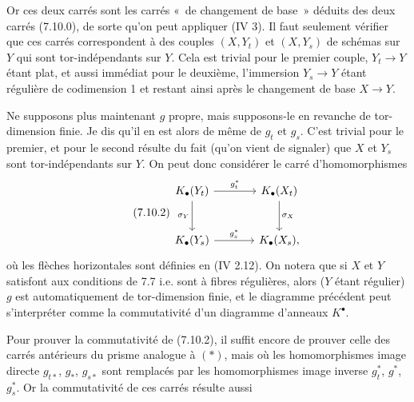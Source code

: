 

Or ces
deux carrés sont les carrés «~de changement de base~» déduits des deux carrés (7.10.0), de sorte qu'on peut appliquer (IV 3). Il faut seulement vérifier que ces carrés correspondent à des couples \((X,Y_t)\) et \((X,Y_s)\) de schémas sur \(Y\) qui sont tor-indépendants sur \(Y\). Cela est trivial pour le premier couple, \(Y_t\to Y\) étant plat, et aussi immédiat pour le deuxième, l'immersion \(Y_s\to Y\) étant régulière de codimension 1 et restant ainsi après le changement de base \(X\to Y\).

Ne supposons plus maintenant \(g\) propre, mais supposons-le en revanche de tor-dimension finie. Je dis qu'il en est alors de même de \(g_t\) et \(g_s\). C'est trivial pour le premier, et pour le second résulte du fait (qu'on vient de signaler) que \(X\) et \(Y_s\) sont tor-indépendants sur \(Y\). On peut donc considérer le carré d'homomorphismes
\begin{equation}\tag{7.10.2}
\begin{tikzcd}[column sep=large,row sep=large]
K_\bullet(Y_t) \arrow[r,"g_t^*"] \arrow[d,"\sigma_Y"'] &
K_\bullet(X_t) \arrow[d,"\sigma_X"]\\
K_\bullet(Y_s) \arrow[r,"g_s^*"] &
K_\bullet(X_s),
\end{tikzcd}
\end{equation}
où les flèches horizontales sont définies en (IV 2.12). On notera que si \(X\) et \(Y\) satisfont aux conditions de 7.7 i.e. sont à fibres régulières, alors (\(Y\) étant régulier) \(g\) est automatiquement de tor-dimension finie, et le diagramme précédent peut s'interpréter comme la commutativité d'un diagramme d'anneaux \(K^\bullet\).

Pour prouver la commutativité de (7.10.2), il suffit encore de prouver celle des carrés antérieurs du prisme analogue à \((*)\), mais où les homomorphismes image directe \(g_{t*}\), \(g_*\), \(g_{s*}\) sont remplacés par les homomorphismes image inverse \(g_t^*\), \(g^*\), \(g_s^*\). Or la commutativité de ces carrés résulte aussi%
